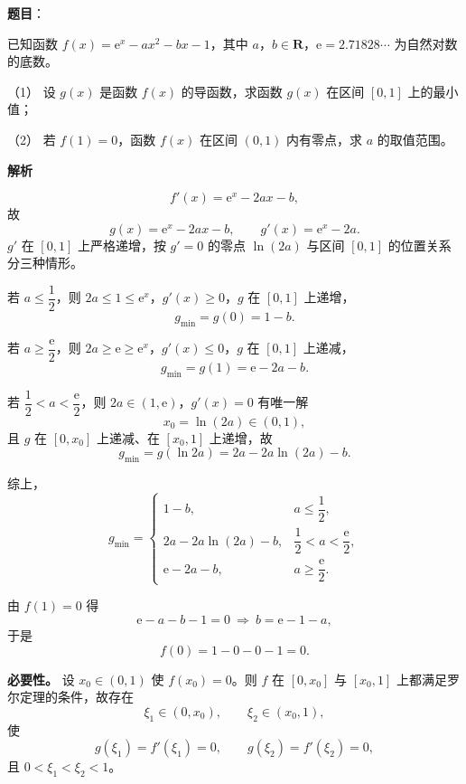 \begin{answer}

\textbf{题目}：

已知函数 $f(x)=\mathrm e^x-ax^2-bx-1$，其中 $a$，$b\in\mathbf R$，$\mathrm e=2.71828\cdots$ 为自然对数的底数。

（1） 设 $g(x)$ 是函数 $f(x)$ 的导函数，求函数 $g(x)$ 在区间 $[0,1]$ 上的最小值；

（2） 若 $f(1)=0$，函数 $f(x)$ 在区间 $(0,1)$ 内有零点，求 $a$ 的取值范围。

\textbf{解析}


\nopagebreak[4]
\[f'(x)=\mathrm e^x-2ax-b,\]
故
\nopagebreak[4]
\[g(x)=\mathrm e^x-2ax-b,\qquad g'(x)=\mathrm e^x-2a .\]
$g'$ 在 $[0,1]$ 上严格递增，按 $g'=0$ 的零点 $\ln(2a)$ 与区间 $[0,1]$ 的位置关系分三种情形。

若 $a\leqslant\dfrac12$，则 $2a\leqslant 1\leqslant\mathrm e^x$，$g'(x)\geqslant 0$，$g$ 在 $[0,1]$ 上递增，
\nopagebreak[4]
\[g_{\min}=g(0)=1-b .\]

若 $a\geqslant\dfrac{\mathrm e}2$，则 $2a\geqslant\mathrm e\geqslant\mathrm e^x$，$g'(x)\leqslant 0$，$g$ 在 $[0,1]$ 上递减，
\nopagebreak[4]
\[g_{\min}=g(1)=\mathrm e-2a-b .\]

若 $\dfrac12<a<\dfrac{\mathrm e}2$，则 $2a\in(1,\mathrm e)$，$g'(x)=0$ 有唯一解
\nopagebreak[4]
\[x_0=\ln(2a)\in(0,1),\]
且 $g$ 在 $[0,x_0]$ 上递减、在 $[x_0,1]$ 上递增，故
\nopagebreak[4]
\[g_{\min}=g(\ln2a)=2a-2a\ln(2a)-b .\]

综上，
\nopagebreak[4]
\[g_{\min}=\begin{cases}
1-b,&a\leqslant\dfrac12,\\[4pt]
2a-2a\ln(2a)-b,&\dfrac12<a<\dfrac{\mathrm e}2,\\[4pt]
\mathrm e-2a-b,&a\geqslant\dfrac{\mathrm e}2 .
\end{cases}\]


由 $f(1)=0$ 得
\nopagebreak[4]
\[\mathrm e-a-b-1=0\ \Longrightarrow\ b=\mathrm e-1-a,\]
于是
\nopagebreak[4]
\[f(0)=1-0-0-1=0 .\]

\textbf{必要性。} 设 $x_0\in(0,1)$ 使 $f(x_0)=0$。则 $f$ 在 $[0,x_0]$ 与 $[x_0,1]$ 上都满足罗尔定理的条件，故存在
\nopagebreak[4]
\[\xi_1\in(0,x_0),\qquad \xi_2\in(x_0,1),\]
使
\nopagebreak[4]
\[g(\xi_1)=f'(\xi_1)=0,\qquad g(\xi_2)=f'(\xi_2)=0,\]
且 $0<\xi_1<\xi_2<1$。


\end{answer}
